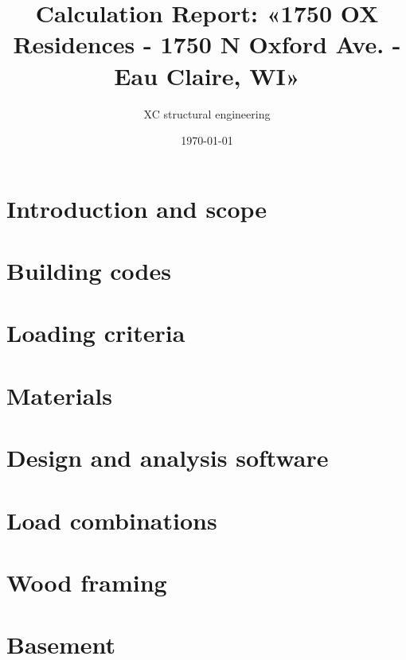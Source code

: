 

\usepackage{array, boldline, makecell, booktabs}
\newcommand\btrule[1]{\specialrule{#1}{0pt}{0pt}}
\usepackage{colortbl}
\usepackage{multicol,caption}               %
\usepackage{xcolor}
\usepackage{hyperref}
\newenvironment{Figure}
  {\par\medskip\noindent\minipage{\linewidth}}
  {\endminipage\par\medskip}
\usepackage{caption}
\usepackage[section]{placeins}
\usepackage{units}

\title{Calculation Report: «1750 OX Residences - 1750 N Oxford Ave. - Eau Claire, WI» }
\author{XC structural engineering}
\date{\today}
\newcommand{\revision}{0.0}
\newcommand{\titdocum}{Calculation Report}

\maketitle
\tableofcontents
\listoftables
\listoffigures
\cleardoublepage
\section{Introduction and scope}

\section{Building codes}

\section{Loading criteria}

\section{Materials}

\section{Design and analysis software}

\section{Load combinations}

\section{Wood framing}

\section{Basement}


